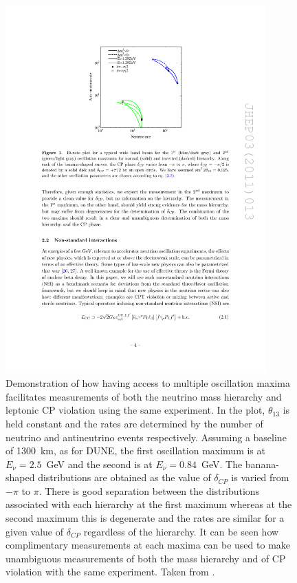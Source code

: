 \begin{figure}
  \centering
  \includegraphics[width=10cm]{TwoPeakAmbiguity.pdf}
  \caption[Demonstration of how having access to multiple oscillation maxima facilitates measurements of both the neutrino mass hierarchy and leptonic CP violation using the same experiment.]{Demonstration of how having access to multiple oscillation maxima facilitates measurements of both the neutrino mass hierarchy and leptonic CP violation using the same experiment.  In the plot, $\theta_{13}$ is held constant and the rates are determined by the number of neutrino and antineutrino events respectively.  Assuming a baseline of 1300~km, as for DUNE, the first oscillation maximum is at $E_{\nu}=2.5$~GeV and the second is at $E_{\nu}=0.84$~GeV.  The banana-shaped distributions are obtained as the value of $\delta_{CP}$ is varied from $-\pi$ to $\pi$.  There is good separation between the distributions associated with each hierarchy at the first maximum whereas at the second maximum this is degenerate and the rates are similar for a given value of $\delta_{CP}$ regardless of the hierarchy.  It can be seen how complimentary measurements at each maxima can be used to make unambiguous measurements of both the mass hierarchy and of CP violation with the same experiment.  Taken from \cite{Huber2011}.}
  \label{fig:TwoPeakAmbiguity}
\end{figure}

